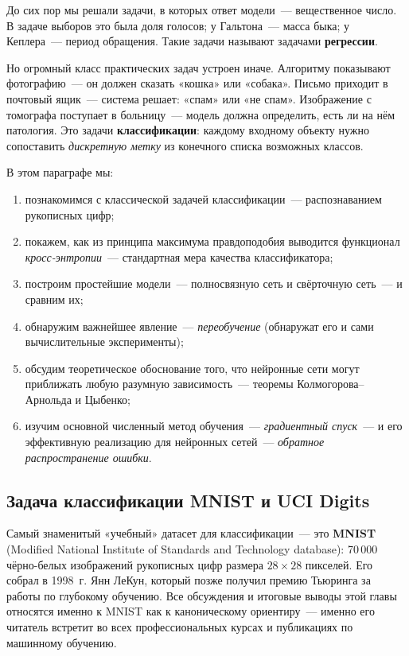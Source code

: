 До сих пор мы решали задачи, в которых ответ модели~--- вещественное
число. В задаче выборов это была доля голосов; у Гальтона~--- масса быка;
у Кеплера~--- период обращения. Такие задачи называют задачами
\textbf{регрессии}.

Но огромный класс практических задач устроен иначе. Алгоритму
показывают фотографию~--- он должен сказать «кошка» или «собака».
Письмо приходит в почтовый ящик~--- система решает: «спам» или «не спам».
Изображение с томографа поступает в больницу~--- модель должна
определить, есть ли на нём патология. Это задачи
\textbf{классификации}: каждому входному объекту нужно сопоставить
\emph{дискретную метку} из конечного списка возможных классов.

В этом параграфе мы:
\begin{enumerate}\itemsep1pt
  \item познакомимся с классической задачей классификации~---
        распознаванием рукописных цифр;
  \item покажем, как из принципа максимума правдоподобия выводится
        функционал \emph{кросс-энтропии}~--- стандартная мера качества
        классификатора;
  \item построим простейшие модели~--- полносвязную сеть и свёрточную
        сеть~--- и сравним их;
  \item обнаружим важнейшее явление~--- \emph{переобучение} (обнаружат
        его и сами вычислительные эксперименты);
  \item обсудим теоретическое обоснование того, что нейронные сети могут
        приближать любую разумную зависимость~--- теоремы
        Колмогорова--Арнольда и Цыбенко;
  \item изучим основной численный метод обучения~--- \emph{градиентный
        спуск}~--- и его эффективную реализацию для нейронных
        сетей~--- \emph{обратное распространение ошибки}.
\end{enumerate}

\subsection{Задача классификации MNIST и UCI Digits}
\label{ssec:mnist}

Самый знаменитый «учебный» датасет для классификации~--- это
\textbf{MNIST} (Modified National Institute of Standards and Technology
database): 70\,000 чёрно-белых изображений рукописных цифр размера
$28\times 28$ пикселей. Его собрал в 1998~г. Янн ЛеКун, который позже
получил премию Тьюринга за работы по глубокому обучению. Все
обсуждения и итоговые выводы этой главы относятся именно к MNIST как
к каноническому ориентиру~--- именно его читатель встретит во всех
профессиональных курсах и публикациях по машинному обучению.

